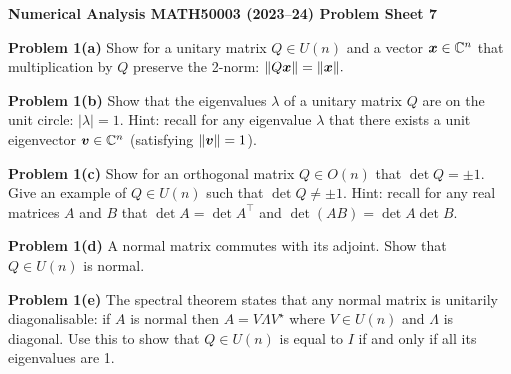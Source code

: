 \documentclass[12pt,a4paper]{article}
\def\endash{–}
\def\bbC{ {\mathbb C} }
\def\x{ {\vc x} }
\def\v{ {\vc v} }
\begin{document}
\textbf{Numerical Analysis MATH50003 (2023\ensuremath{\endash}24) Problem Sheet 7}

\textbf{Problem 1(a)} Show for a unitary matrix $Q \ensuremath{\in} U(n)$ and a vector $\ensuremath{\bm{\x}} \ensuremath{\in} \ensuremath{\bbC}^n$ that multiplication by $Q$ preserve the 2-norm: $\|Q \ensuremath{\bm{\x}}\| = \|\ensuremath{\bm{\x}}\|.$

\textbf{Problem 1(b)} Show that the eigenvalues $\ensuremath{\lambda}$ of a unitary matrix $Q$ are on the unit circle: $|\ensuremath{\lambda}| = 1$. Hint: recall for any eigenvalue $\ensuremath{\lambda}$ that there exists a unit eigenvector $\ensuremath{\bm{\v}} \ensuremath{\in} \ensuremath{\bbC}^n$ (satisfying $\| \ensuremath{\bm{\v}} \| = 1$). 

\textbf{Problem 1(c)} Show for an orthogonal matrix $Q \ensuremath{\in} O(n)$ that $\det Q = \ensuremath{\pm}1$. Give an example of $Q \ensuremath{\in} U(n)$ such that $\det Q \ensuremath{\neq} \ensuremath{\pm}1$. Hint: recall for any real matrices $A$ and $B$ that $\det A = \det A^\ensuremath{\top}$ and $\det(AB) = \det A \det B$.

\textbf{Problem 1(d)} A normal matrix commutes with its adjoint. Show that $Q \ensuremath{\in} U(n)$ is normal.

\textbf{Problem 1(e)}  The spectral theorem states that any normal matrix is unitarily diagonalisable: if $A$ is normal then $A = V \ensuremath{\Lambda} V^\ensuremath{\star}$ where $V \ensuremath{\in} U(n)$ and $\ensuremath{\Lambda}$ is diagonal. Use this to show that  $Q \ensuremath{\in} U(n)$ is equal to $I$ if and only if all its eigenvalues are 1.
\end{document}
